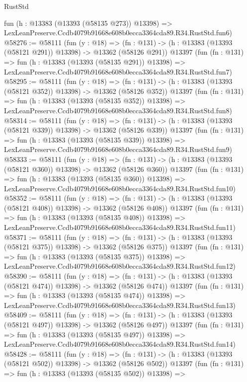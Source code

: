 \begin{lexlean}{RustStd}
\begin{coremodule}
    fun (h : @13383 (@13393 (@58135 @273)) @13398) =>
    LexLeanPreserve.Ccdb4079b91668e608b0ecca3364cda89.R34.RustStd.fun6)
@58276 := @58111
    (fun (y : @18) =>
    (fn : @131) -> (h : @13383 (@13393 (@58121 @291)) @13398) -> @13362 (@58126 @291))
    @13397
    (fun (fn : @131) =>
    fun (h : @13383 (@13393 (@58135 @291)) @13398) =>
    LexLeanPreserve.Ccdb4079b91668e608b0ecca3364cda89.R34.RustStd.fun7)
@58295 := @58111
    (fun (y : @18) =>
    (fn : @131) -> (h : @13383 (@13393 (@58121 @352)) @13398) -> @13362 (@58126 @352))
    @13397
    (fun (fn : @131) =>
    fun (h : @13383 (@13393 (@58135 @352)) @13398) =>
    LexLeanPreserve.Ccdb4079b91668e608b0ecca3364cda89.R34.RustStd.fun8)
@58314 := @58111
    (fun (y : @18) =>
    (fn : @131) -> (h : @13383 (@13393 (@58121 @339)) @13398) -> @13362 (@58126 @339))
    @13397
    (fun (fn : @131) =>
    fun (h : @13383 (@13393 (@58135 @339)) @13398) =>
    LexLeanPreserve.Ccdb4079b91668e608b0ecca3364cda89.R34.RustStd.fun9)
@58333 := @58111
    (fun (y : @18) =>
    (fn : @131) -> (h : @13383 (@13393 (@58121 @360)) @13398) -> @13362 (@58126 @360))
    @13397
    (fun (fn : @131) =>
    fun (h : @13383 (@13393 (@58135 @360)) @13398) =>
    LexLeanPreserve.Ccdb4079b91668e608b0ecca3364cda89.R34.RustStd.fun10)
@58352 := @58111
    (fun (y : @18) =>
    (fn : @131) -> (h : @13383 (@13393 (@58121 @408)) @13398) -> @13362 (@58126 @408))
    @13397
    (fun (fn : @131) =>
    fun (h : @13383 (@13393 (@58135 @408)) @13398) =>
    LexLeanPreserve.Ccdb4079b91668e608b0ecca3364cda89.R34.RustStd.fun11)
@58371 := @58111
    (fun (y : @18) =>
    (fn : @131) -> (h : @13383 (@13393 (@58121 @375)) @13398) -> @13362 (@58126 @375))
    @13397
    (fun (fn : @131) =>
    fun (h : @13383 (@13393 (@58135 @375)) @13398) =>
    LexLeanPreserve.Ccdb4079b91668e608b0ecca3364cda89.R34.RustStd.fun12)
@58390 := @58111
    (fun (y : @18) =>
    (fn : @131) -> (h : @13383 (@13393 (@58121 @474)) @13398) -> @13362 (@58126 @474))
    @13397
    (fun (fn : @131) =>
    fun (h : @13383 (@13393 (@58135 @474)) @13398) =>
    LexLeanPreserve.Ccdb4079b91668e608b0ecca3364cda89.R34.RustStd.fun13)
@58409 := @58111
    (fun (y : @18) =>
    (fn : @131) -> (h : @13383 (@13393 (@58121 @497)) @13398) -> @13362 (@58126 @497))
    @13397
    (fun (fn : @131) =>
    fun (h : @13383 (@13393 (@58135 @497)) @13398) =>
    LexLeanPreserve.Ccdb4079b91668e608b0ecca3364cda89.R34.RustStd.fun14)
@58428 := @58111
    (fun (y : @18) =>
    (fn : @131) -> (h : @13383 (@13393 (@58121 @502)) @13398) -> @13362 (@58126 @502))
    @13397
    (fun (fn : @131) =>
    fun (h : @13383 (@13393 (@58135 @502)) @13398) =>

\end{coremodule}
\end{lexlean}

